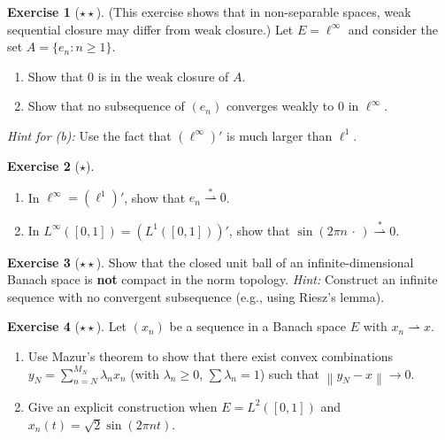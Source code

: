 \documentclass[a4paper,12pt]{book}
\newcommand{\norm}[1]{\left\| #1 \right\|}
\newcommand{\weakto}{\rightharpoonup}
\newcommand{\weakstarto}{\overset{*}{\rightharpoonup}}
\theoremstyle{definition}
\newtheorem{exercise}{Exercise}[chapter]
\theoremstyle{plain}
\theoremstyle{remark}
\begin{document}
\begin{exercise}[$\star\star$]\label{exo:weak-closed-not-seq-closed}
(This exercise shows that in non-separable spaces, weak sequential closure
may differ from weak closure.)
Let $E = \ell^\infty$ and consider the set $A = \{e_n : n\ge 1\}$.
\begin{enumerate}[label=(\alph*)]
  \item Show that $0$ is in the weak closure of $A$.
  \item Show that no subsequence of $(e_n)$ converges weakly to $0$ in
        $\ell^\infty$.
\end{enumerate}
\textit{Hint for (b):} Use the fact that $(\ell^\infty)'$ is much larger
than $\ell^1$.
\end{exercise}

\begin{exercise}[$\star$]\label{exo:weak-star-basic}
\begin{enumerate}[label=(\alph*)]
  \item In $\ell^\infty = (\ell^1)'$, show that $e_n\weakstarto 0$.
  \item In $L^\infty([0,1]) = (L^1([0,1]))'$, show that $\sin(2\pi n\,\cdot\,)
        \weakstarto 0$.
\end{enumerate}
\end{exercise}

\begin{exercise}[$\star\star$]\label{exo:alaoglu-necessity}
Show that the closed unit ball of an infinite-dimensional Banach space is
\textbf{not} compact in the norm topology.
\textit{Hint:} Construct an infinite sequence with no convergent subsequence
(e.g., using Riesz's lemma).
\end{exercise}

\begin{exercise}[$\star\star$]\label{exo:mazur-application}
Let $(x_n)$ be a sequence in a Banach space $E$ with $x_n\weakto x$.
\begin{enumerate}[label=(\alph*)]
  \item Use Mazur's theorem to show that there exist convex combinations
        $y_N = \sum_{n=N}^{M_N}\lambda_n x_n$ (with $\lambda_n\ge 0$,
        $\sum\lambda_n=1$) such that $\norm{y_N-x}\to 0$.
  \item Give an explicit construction when $E = L^2([0,1])$ and
        $x_n(t) = \sqrt{2}\sin(2\pi nt)$.
\end{enumerate}
\end{exercise}
\end{document}
